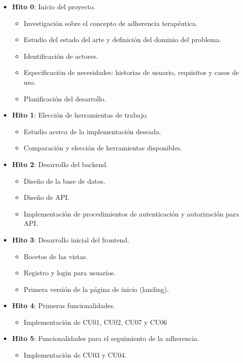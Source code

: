 \begin{itemize}
	\item \textbf{Hito 0}: Inicio del proyecto.
	\begin{itemize}
		\item Investigación sobre el concepto de adherencia terapéutica.
		\item Estudio del estado del arte y definición del dominio del problema.
		\item Identificación de actores.
		\item Especificación de necesidades: historias de usuario, requisitos y casos de uso.
		\item Planificación del desarrollo.
	\end{itemize}

	
	\item  \textbf{Hito 1}: Elección de herramientas de trabajo.
	\begin{itemize}
		\item Estudio acerca de la implementación deseada.
		\item Comparación y elección de herramientas disponibles.
	\end{itemize}

	\item  \textbf{Hito 2}: Desarrollo del backend.
	\begin{itemize}
		\item Diseño de la base de datos.
		\item Diseño de API.
		\item Implementación de procedimientos de autenticación y autorización para API.
	\end{itemize}

	
	\item  \textbf{Hito 3}: Desarrollo inicial del frontend.
	\begin{itemize}
		\item Bocetos de las vistas.
		\item Registro y login para usuarios.
		\item Primera versión de la página de inicio (landing).
	\end{itemize}

	\item \textbf{Hito 4}: Primeras funcionalidades.
	\begin{itemize}
		\item Implementación de CU01, CU02, CU07 y CU06
	\end{itemize}

	\item \textbf{Hito 5}: Funcionalidades para el seguimiento de la adherencia.
	\begin{itemize}
		\item Implementación de CU03 y CU04.
	\end{itemize}


\end{itemize}
